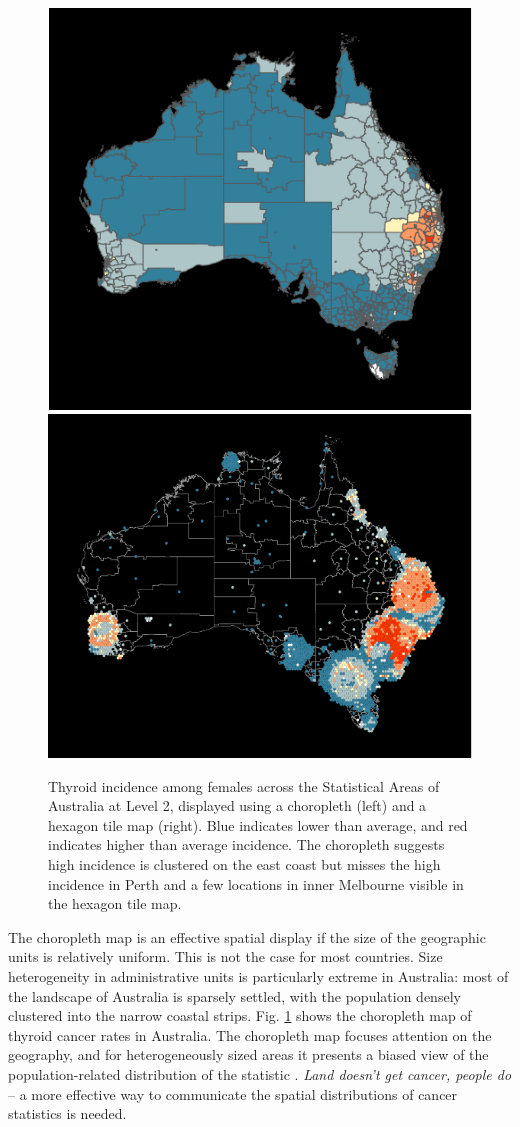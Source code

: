 \documentclass[times, doublespace]{anzsauth}
\begin{document}
\begin{figure}

{\centering 
\includegraphics[width=0.46\linewidth]{paper_files/figure-latex/thyroid-choro-1} 
\includegraphics[width=0.54\linewidth]{paper_files/figure-latex/thyroid-hex-1} 
}

\caption{Thyroid incidence among females across the Statistical Areas of Australia at Level 2, displayed using a choropleth (left) and a hexagon tile map (right). Blue indicates lower than average, and red indicates higher than average incidence. The choropleth suggests high incidence is clustered on the east coast but misses the high incidence in Perth and a few locations in inner Melbourne visible in the hexagon tile map.}\label{fig:thyroid}
\end{figure}

The choropleth map is an effective spatial display if the size of the
geographic units is relatively uniform. This is not the case for most
countries. Size heterogeneity in administrative units is particularly
extreme in Australia: most of the landscape of Australia is sparsely
settled, with the population densely clustered into the narrow coastal
strips. Fig. \ref{fig:thyroid} shows the choropleth map of thyroid
cancer rates in Australia. The choropleth map focuses attention on the
geography, and for heterogeneously sized areas it presents a biased view
of the population-related distribution of the statistic
\citep{CBATCC}. \emph{Land doesn't get cancer, people
do} -- a more effective way to communicate the spatial distributions of
cancer statistics is needed.
\end{document}
